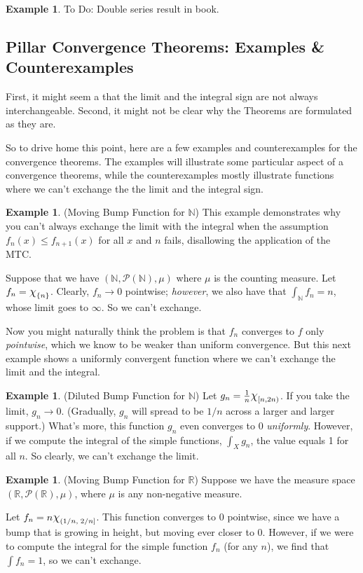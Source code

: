 \documentclass[12pt]{article}
\theoremstyle{plain}
\theoremstyle{definition}
\newtheorem{ex}[thm]{Example}
\theoremstyle{remark}
\newcommand*{\Chi}{\mbox{\large$\chi$}} %
\begin{document}
\begin{ex}
To Do: Double series result in book.
\end{ex}

\subsection{Pillar Convergence Theorems: Examples \& Counterexamples}

First, it might seem a that the limit and the integral sign are not always interchangeable. Second, it might not be clear why the Theorems are formulated as they are.  

So to drive home this point, here are a few examples and counterexamples for the convergence theorems. The examples will illustrate some particular aspect of a convergence theorems, while the counterexamples mostly illustrate functions where we can't exchange the the limit and the integral sign.

\begin{ex}
(Moving Bump Function for $\mathbb{N}$) This example demonstrates why you can't always exchange the limit with the integral when the assumption $f_n(x)\leq f_{n+1}(x)$ for all $x$ and $n$ fails, disallowing the application of the MTC.

Suppose that we have $(\mathbb{N},\mathscr{P}(\mathbb{N}),\mu)$ where $\mu$ is the counting measure.  Let $f_n = \Chi_{\{n\}}$.  Clearly, $f_n\rightarrow 0$ pointwise; \emph{however}, we also have that $\int_\mathbb{N} f_n = n$, whose limit goes to $\infty$. So we can't exchange.

Now you might naturally think the problem is that $f_n$ converges to $f$ only \emph{pointwise}, which we know to be weaker than uniform convergence. But this next example shows a uniformly convergent function where we can't exchange the limit and the integral.
\end{ex}

\begin{ex} (Diluted Bump Function for $\mathbb{N}$)
Let $g_n = \frac{1}{n}\Chi_{[n,2n)}$. If you take the limit, $g_n\rightarrow 0$. (Gradually, $g_n$ will spread to be $1/n$ across a larger and larger support.) What's more, this function $g_n$ even converges to 0 \emph{uniformly}. However, if we compute the integral of the simple functions, $\int_X g_n$, the value equals 1 for all $n$. So clearly, we can't exchange the limit. 
\end{ex}

\begin{ex}
(Moving Bump Function for $\mathbb{R}$) Suppose we have the measure space $(\mathbb{R},\mathscr{P}(\mathbb{R}),\mu)$, where $\mu$ is any non-negative measure. 

Let $f_n = n\Chi_{(1/n,\;2/n]}$. This function converges to 0 pointwise, since we have a bump that is growing in height, but moving ever closer to 0. However, if we were to compute the integral for the simple function $f_n$ (for any $n$), we find that $\int f_n = 1$, so we can't exchange.
\end{ex} 
\end{document}
